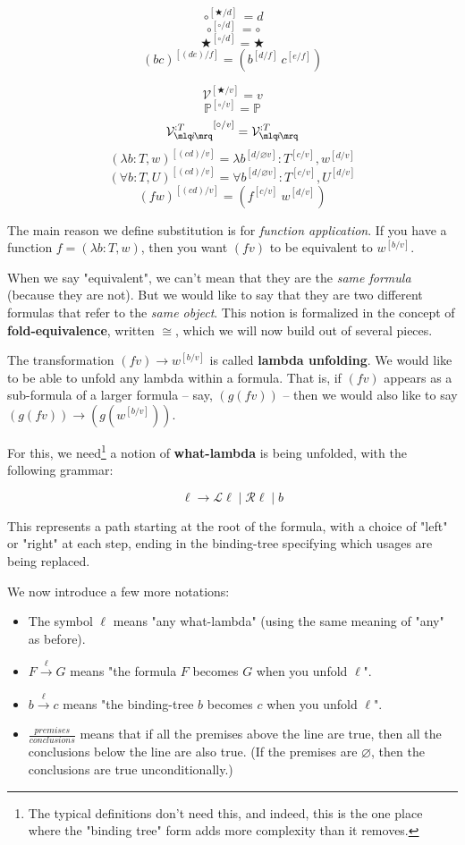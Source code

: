 \documentclass{article}
\newcommand{\Prop}{\mathbb{P}}
\newcommand{\usage}{\mathcal{V}}
\newcommand{\usageKnown}[2]{{\usage_{\mlq\hspace{-0.06em}#2\hspace{-0.06em}\mrq}^{:#1}}}
\newcommand{\subst}[3]{#1^{[{#2}{/}{#3}]}}
\newcommand{\bindvariable}{\bigstar}
\newcommand{\bindnotthis}{\circ}
\newcommand{\emptybindingslike}[1]{\varnothing #1}
\newcommand{\betaeq}{\cong}
\newcommand{\betared}[1]{\overset{#1}{\rightarrow}}
\newcommand{\anywhat}{\ell}
\begin{document}
  \[\subst{\bindnotthis}{\bindvariable}{d} = d\]
  \[\subst{\bindnotthis}{\bindnotthis}{d} = \bindnotthis\]
  \[\subst{\bindvariable}{\bindnotthis}{d} = \bindvariable\]
  \[\subst{(bc)}{(de)}{f} = (\subst{b}{d}{f}\ \subst{c}{e}{f})\]
  
  \[\subst{\usage}{\bindvariable}{v} = v\]
  \[\subst{\Prop}{\bindnotthis}{v} = \Prop\]
  \[\subst{\usageKnown{T}{i}}{\bindnotthis}{v} = \usageKnown{T}{i}\]
  \[\subst{(\lambda b:T,w)}{(cd)}{v} = \lambda \subst{b}{d}{\emptybindingslike{v}}:\subst{T}{c}{v},\subst{w}{d}{v}\]
  \[\subst{(\forall b:T,U)}{(cd)}{v} = \forall \subst{b}{d}{\emptybindingslike{v}}:\subst{T}{c}{v},\subst{U}{d}{v}\]
  \[\subst{(f w)}{(cd)}{v} = (\subst{f}{c}{v}\ \subst{w}{d}{v})\]

The main reason we define substitution is for \emph{function application}. If you have a function $f =(\lambda b:T,w)$, then you want $(f v)$ to be equivalent to $\subst{w}{b}{v}$.

When we say "equivalent", we can't mean that they are the \emph{same formula} (because they are not). But we would like to say that they are two different formulas that refer to the \emph{same object}. This notion is formalized in the concept of \textbf{fold-equivalence}, written $\betaeq$, which we will now build out of several pieces.

The transformation $(f v) \rightarrow \subst{w}{b}{v}$ is called \textbf{lambda unfolding}. We would like to be able to unfold any lambda within a formula. That is, if $(f v)$ appears as a sub-formula of a larger formula – say, $(g (f v))$ – then we would also like to say $(g (f v)) \rightarrow (g(\subst{w}{b}{v}))$.

For this, we need\footnote{The typical definitions don't need this, and indeed, this is the one place where the "binding tree" form adds more complexity than it removes.} a notion of \textbf{what-lambda} is being unfolded, with the following grammar:

\[\anywhat \rightarrow \mathcal{L}\anywhat \mid \mathcal{R}\anywhat \mid b\]
  
  This represents a path starting at the root of the formula, with a choice of "left" or "right" at each step, ending in the binding-tree specifying which usages are being replaced.

  We now introduce a few more notations:
  
  \begin{itemize}
  \item The symbol $\anywhat$ means "any what-lambda" (using the same meaning of "any" as before).
  \item $F \betared{\anywhat} G$ means "the formula $F$ becomes $G$ when you unfold $\anywhat$".
  \item $b \betared{\anywhat} c$ means "the binding-tree $b$ becomes $c$ when you unfold $\anywhat$".
  \item $\frac{premises}{conclusions}$ means that if all the premises above the line are true, then all the conclusions below the line are also true. (If the premises are $\varnothing$, then the conclusions are true unconditionally.)
  \end{itemize}
  
\end{document}
